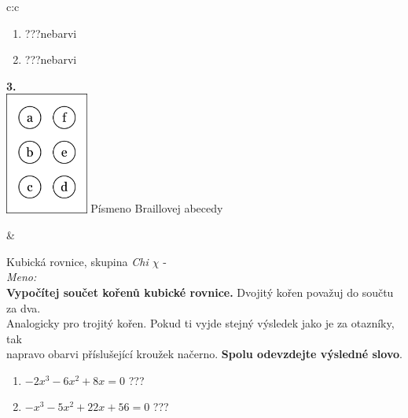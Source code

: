 \documentclass[10pt]{report}
\begin{document}
\begin{tabular}{c:c}
\begin{minipage}[c][99mm][t]{0.49\linewidth}
\begin{center}
\begin{minipage}{0.77\linewidth}
\begin{center}
\begin{varwidth}{\textwidth}
\begin{enumerate}
\item \quad \dotfill\; ???\;\dotfill \quad nebarvi
\item \quad \dotfill\; ???\;\dotfill \quad nebarvi
\end{enumerate}
\end{varwidth}
\end{center}
\end{minipage}
\begin{minipage}{0.20\linewidth}
\begin{center}
{\Huge\bfseries 3.} \\[2mm]
\includegraphics[height=40mm]{../images/braille.png}
{\small Písmeno Braillovej abecedy}
\end{center}
\end{minipage}
\end{center}
\end{minipage}
&
\begin{minipage}[c][99mm][t]{0.49\linewidth}
\begin{center}
\vspace{7mm}
{\huge Kubická rovnice, skupina \textit{Chi $\chi$} -}\\[4.5mm]
\textit{Meno:}\phantom{xxxxxxxxxxxxxxxxxxxxxxxxxxxxxxxxxxxxxxxxxxxxxxxxxxxxxxxxxxxxxxxxx}\\[3.5mm]
\textbf{Vypočítej součet kořenů kubické rovnice.} Dvojitý kořen považuj do součtu za dva.\\Analogicky pro trojitý kořen. Pokud ti vyjde stejný výsledek jako je za otazníky, tak\\napravo obarvi příslušející kroužek načerno. \textbf{Spolu odevzdejte výsledné slovo}.\\[3mm]
\begin{minipage}{0.77\linewidth}
\begin{center}
\begin{varwidth}{\textwidth}
\begin{enumerate}
\large
\item $-2x^3-6x^2+8x=0$\quad \dotfill\; ???\;\dotfill {}
\item $-x^3-5x^2+22x+56=0$\quad \dotfill\; ???\;\dotfill {}

\end{enumerate}
\end{varwidth}
\end{center}
\end{minipage}
\end{center}
\end{minipage}
\end{tabular}
\end{document}
